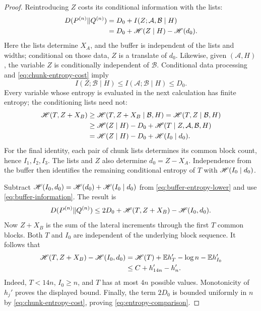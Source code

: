 \begin{proof}
Reintroducing \(Z\) costs its conditional information with the lists:
\begin{equation}
 \begin{split}
 D(P^{(n)}\Vert Q^{(n)})
 &=D_0+I(Z;\mathcal A,\mathcal B\mid H)\\
 &=D_0+\mathscr H(Z\mid H)-\mathscr H(d_0).
 \end{split}
 \label{eq:buffer-information}
\end{equation}
Here the lists determine \(X_A\), and the buffer is independent of the
lists and widths; conditional on those data, \(Z\) is a translate of
\(d_0\).  Likewise, given \((\mathcal A,H)\), the variable \(Z\) is
conditionally independent of \(\mathcal B\).  Conditional data processing
and \eqref{eq:chunk-entropy-cost} imply
\[
 I(Z;\mathcal B\mid H)
 \le I(\mathcal A;\mathcal B\mid H)\le D_0.
\]
Every variable whose entropy is evaluated in the next calculation has
finite entropy; the conditioning lists need not:
\begin{align}
 \mathscr H(T,Z+X_B)
 &\ge\mathscr H(T,Z+X_B\mid\mathcal B,H)
   =\mathscr H(T,Z\mid\mathcal B,H)\notag\\
 &\ge\mathscr H(Z\mid H)-D_0
       +\mathscr H(T\mid Z,\mathcal A,\mathcal B,H)\notag\\
 &=\mathscr H(Z\mid H)-D_0+\mathscr H(I_0\mid d_0).
 \label{eq:buffer-entropy-lower}
\end{align}
For the final identity, each pair of chunk lists determines its common
block count, hence \(I_1,I_2,I_3\).  The lists and \(Z\) also determine
\(d_0=Z-X_A\).  Independence from the buffer then identifies the
remaining conditional entropy of \(T\) with \(\mathscr H(I_0\mid d_0)\).

Subtract \(\mathscr H(I_0,d_0)=\mathscr H(d_0)+\mathscr H(I_0\mid d_0)\) from
\eqref{eq:buffer-entropy-lower} and use
\eqref{eq:buffer-information}.  The result is
\begin{equation}
 D(P^{(n)}\Vert Q^{(n)})
 \le 2D_0+\mathscr H(T,Z+X_B)-\mathscr H(I_0,d_0).
 \label{eq:two-entropy-costs}
\end{equation}
Now \(Z+X_B\) is the sum of the lateral increments through the first
\(T\) common blocks.  Both \(T\) and \(I_0\) are independent of the
underlying block sequence.  It follows that
\begin{align*}
 \mathscr H(T,Z+X_B)-\mathscr H(I_0,d_0)
 &=\mathscr H(T)+\mathbb E h_T'-\log n-\mathbb E h_{I_0}'\\
 &\le C+h_{14n}'-h_n'.
\end{align*}
Indeed, \(T<14n\), \(I_0\ge n\), and \(T\) has at most \(4n\)
possible values.  Monotonicity of \(h_j'\) proves the displayed bound.
Finally, the term \(2D_0\) is bounded uniformly in \(n\) by
\eqref{eq:chunk-entropy-cost}, proving
\eqref{eq:entropy-comparison}.
\end{proof}


